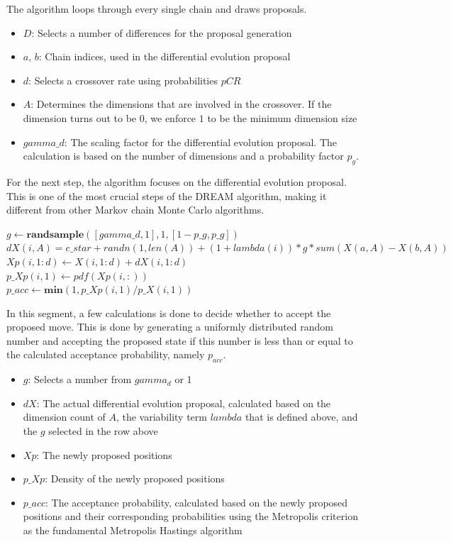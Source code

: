 The algorithm loops through every single chain and draws proposals.
\begin{itemize}
    \item $D$: Selects a number of differences for the proposal generation
    \item $a$, $b$: Chain indices, used in the differential evolution proposal
    \item $d$: Selects a crossover rate using probabilities $pCR$
    \item $A$: Determines the dimensions that are involved in the crossover. If the dimension turns out to be $0$, we enforce $1$ to be the minimum dimension size
    \item $gamma\_d$: The scaling factor for the differential evolution proposal. The calculation is based on the number of dimensions and a probability factor $p_g$.
\end{itemize}

For the next step, the algorithm focuses on the differential evolution proposal. This is one of the most crucial steps of the DREAM algorithm, making it different from other Markov chain Monte Carlo algorithms.

\begin{algorithm}[H]
$g \gets \textbf{randsample}([gamma\_d, 1], 1, [1-p\_g, p\_g])$\\
$dX(i, A) = c\_star + randn(1, len(A)) + (1 + lambda(i)) * g * sum(X(a, A) - X(b, A))$\\
$Xp(i, 1:d) \gets X(i, 1:d) + dX(i, 1:d)$\\
$p\_Xp(i, 1) \gets pdf(Xp(i, :))$\\
$p\_acc \gets \textbf{min}(1, p\_Xp(i, 1) / p\_X(i, 1))$
\end{algorithm}

In this segment, a few calculations is done to decide whether to accept the proposed move. This is done by generating a uniformly distributed random number and accepting the proposed state if this number is less than or equal to the calculated acceptance probability, namely $p_{acc}$.

\begin{itemize}
    \item $g$: Selects a number from $gamma_d$ or 1
    \item $dX$: The actual differential evolution proposal, calculated based on the dimension count of $A$, the variability term $lambda$ that is defined above, and the $g$ selected in the row above
    \item $Xp$: The newly proposed positions
    \item $p\_Xp$: Density of the newly proposed positions
    \item $p\_acc$: The acceptance probability, calculated based on the newly proposed positions and their corresponding probabilities using the Metropolis criterion as the fundamental Metropolis Hastings algorithm
\end{itemize}

